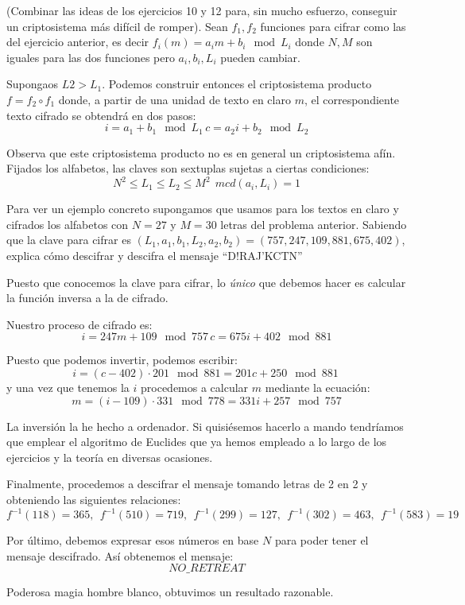 \begin{problem}[13]
(Combinar las ideas de los ejercicios 10 y 12 para, sin mucho esfuerzo, conseguir un criptosistema más difícil de romper). Sean $f_1,f_2$ funciones para cifrar como las del ejercicio anterior, es decir $f_i(m)=a_im+b_i \mod L_i$ donde $N,M$ son iguales para las dos funciones pero $a_i,b_i,L_i$ pueden cambiar.

Supongaos $L2>L_1$. Podemos construir entonces el criptosistema producto $f= f_2 \circ f_1$ donde, a partir de una unidad de texto en claro $m$, el correspondiente texto cifrado se obtendrá en dos pasos:
\[i=a_1+b_1 \mod L_1 \, c=a_2i+b_2 \mod L_2\]

Observa que este criptosistema producto no es en general un criptosistema afín. Fijados los alfabetos, las claves son sextuplas sujetas a ciertas condiciones:
\[N^2 \leq L_1 \leq L_2 \leq M^2 \ \ mcd(a_i,L_i)=1\]

Para ver un ejemplo concreto supongamos que usamos para los textos en claro y cifrados los alfabetos con $N=27$ y $M=30$ letras del problema anterior. Sabiendo que la clave para cifrar es $(L_1,a_1,b_1,L_2,a_2,b_2)=(757,247,109,881,675,402)$, explica cómo descifrar y descifra el mensaje ``D!RAJ'KCTN''
\solution


Puesto que conocemos la clave para cifrar, lo \textit{único} que debemos hacer es calcular la función inversa a la de cifrado.

Nuestro proceso de cifrado es:
\[i=247m + 109 \mod 757 \, c=675i+402 \mod 881\]

Puesto que podemos invertir, podemos escribir:
\[i = (c-402)\cdot 201 \mod 881 = 201 c + 250 \mod 881 \ \]
y una vez que tenemos la $i$ procedemos a calcular $m$ mediante la ecuación:
\[m = (i-109)\cdot 331 \mod 778 = 331i +257 \mod 757\]

\obs La inversión la he hecho a ordenador. Si quisiésemos hacerlo a mando tendríamos que emplear el algoritmo de Euclides que ya hemos empleado a lo largo de los ejercicios y la teoría en diversas ocasiones.

Finalmente, procedemos a descifrar el mensaje tomando letras de 2 en 2 y obteniendo las siguientes relaciones:
\[f^{-1}(118) = 365,\ \ f^{-1}(510) = 719,\ \ f^{-1}(299) = 127,\ \ f^{-1}(302) = 463,\ \ f^{-1}(583) = 19\ \]

Por último, debemos expresar esos números en base $N$ para poder tener el mensaje descifrado. Así obtenemos el mensaje:
\[NO\_RETREAT\]

Poderosa magia hombre blanco, obtuvimos un resultado razonable.
\end{problem}

